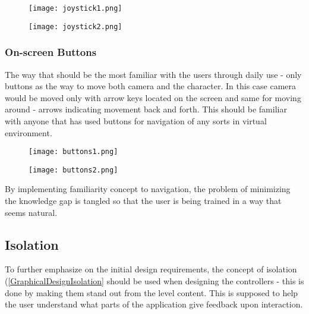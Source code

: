 \begin{figure}[H]
\centering
\begin{minipage}{.5\textwidth}
  \centering
  \texttt{[image: joystick1.png]}
\end{minipage}%
\begin{minipage}{.5\textwidth}
  \centering
  \texttt{[image: joystick2.png]}
\end{minipage}
\end{figure}

\subsubsection{On-screen Buttons}
The way that should be the most familiar with the users through daily use - only buttons as the way to move both camera and the character. In this case camera would be moved only with arrow keys located on the screen and same for moving around - arrows indicating movement back and forth. This should be familiar with anyone that has used buttons for navigation of any sorts in virtual environment.

\begin{figure}[H]
\centering
\begin{minipage}{.5\textwidth}
  \centering
  \texttt{[image: buttons1.png]}
\end{minipage}%
\begin{minipage}{.5\textwidth}
  \centering
  \texttt{[image: buttons2.png]}
\end{minipage}
\end{figure}


By implementing familiarity concept to navigation, the problem of minimizing the knowledge gap is tangled so that the user is being trained in a way that seems natural.



\subsection{Isolation}
To further emphasize on the initial design requirements, the concept of isolation (\ref{GraphicalDesignIsolation} should be used when designing the controllers - this is done by making them stand out from the level content. This is supposed to help the user understand what parts of the application give feedback upon interaction.

